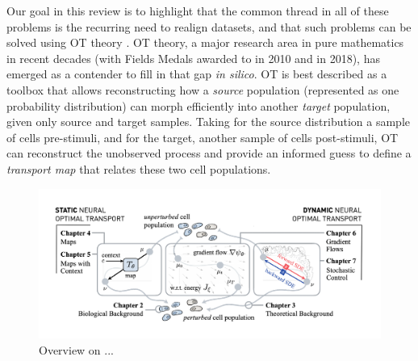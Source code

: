 Our goal in this review is to highlight that the common thread in all of these problems is the recurring need to realign datasets, and that such problems can be solved using \acrlong{OT} theory \citep{villani2021topics, santambrogio2015optimal}.
OT theory, a major research area in pure mathematics in recent decades (with Fields Medals awarded to \citeauthor{villani2021topics} in 2010 and \citeauthor{figalli2017monge} in 2018), has emerged as a contender to fill in that gap \textit{in silico}. OT is best described as a toolbox that allows reconstructing how a \emph{source} population (represented as one probability distribution) can morph efficiently into another \emph{target} population, given only source and target samples. Taking for the source distribution a sample of cells pre-stimuli, and for the target, another sample of cells post-stimuli, OT can reconstruct the unobserved process and provide an informed guess to define a \emph{transport map} that relates these two cell populations. 

\begin{figure}[t]
  \includegraphics[width=\textwidth]{figures/fig_overview_thesis.pdf}
  \caption{Overview on ...}
\end{figure}



